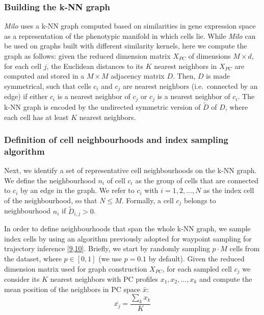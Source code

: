 \documentclass[
]{article}
\begin{document}
\hypertarget{building-the-k-nn-graph}{%
\subsubsection{Building the k-NN graph}\label{building-the-k-nn-graph}}

\emph{Milo} uses a k-NN graph computed based on similarities in gene expression space as a representation of the phenotypic manifold in which cells lie. While \emph{Milo} can be used on graphs built with different similarity kernels, here we compute the graph as follows: given the reduced dimension matrix \(X_{PC}\) of dimensions \(M \times d\), for each cell \(j\), the Euclidean distances to its \(K\) nearest neighbors in \(X_{PC}\) are computed and stored in a \(M \times M\) adjacency matrix \(D\). Then, \(D\) is made symmetrical, such that cells \(c_i\) and \(c_j\) are nearest neighbors (i.e.~connected by an edge) if either \(c_i\) is a nearest neighbor of \(c_j\) or \(c_j\) is a nearest neighbor of \(c_i\). The k-NN graph is encoded by the undirected symmetric version of \(\tilde{D}\) of \(D\), where each cell has at least \(K\) nearest neighbors.

\hypertarget{nh}{%
\subsubsection{Definition of cell neighbourhoods and index sampling algorithm}\label{nh}}

Next, we identify a set of representative cell neighbourhoods on the k-NN graph. We define the neighbourhood \(n_i\) of cell \(c_i\) as the group of cells that are connected to \(c_i\) by an edge in the graph. We refer to \(c_i\) with \(i=1,2,...,N\) as the index cell of the neighbourhood, so that \(N \leq M\).
Formally, a cell \(c_j\) belongs to neighbourhood \(n_i\) if \(\tilde{D}_{i,j} > 0\).

In order to define neighbourhoods that span the whole k-NN graph, we sample index cells by using an algorithm previously adopted for waypoint sampling for trajectory inference {[}\protect\hyperlink{ref-gutTrajectoriesCellcycleProgression2015}{9},\protect\hyperlink{ref-settyWishboneIdentifiesBifurcating2016}{10}{]}.
Briefly, we start by randomly sampling \(p \cdot M\) cells from the dataset, where \(p \in [0,1]\) (we use \(p = 0.1\) by default).
Given the reduced dimension matrix used for graph construction \(X_{PC}\), for each sampled cell \(c_j\) we consider its \(K\) nearest neighbors with PC profiles \({x_1, x_2, ... , x_k}\) and compute the mean position of the neighbors in PC space \(\bar{x}\):
\[
\bar{x_j} = \frac{ \sum_k x_k }{K}
\]
\end{document}
